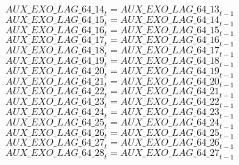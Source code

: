 \begin{dmath}
{AUX\_EXO\_LAG\_64\_14}_{t}={AUX\_EXO\_LAG\_64\_13}_{t-1}
\end{dmath}
\begin{dmath}
{AUX\_EXO\_LAG\_64\_15}_{t}={AUX\_EXO\_LAG\_64\_14}_{t-1}
\end{dmath}
\begin{dmath}
{AUX\_EXO\_LAG\_64\_16}_{t}={AUX\_EXO\_LAG\_64\_15}_{t-1}
\end{dmath}
\begin{dmath}
{AUX\_EXO\_LAG\_64\_17}_{t}={AUX\_EXO\_LAG\_64\_16}_{t-1}
\end{dmath}
\begin{dmath}
{AUX\_EXO\_LAG\_64\_18}_{t}={AUX\_EXO\_LAG\_64\_17}_{t-1}
\end{dmath}
\begin{dmath}
{AUX\_EXO\_LAG\_64\_19}_{t}={AUX\_EXO\_LAG\_64\_18}_{t-1}
\end{dmath}
\begin{dmath}
{AUX\_EXO\_LAG\_64\_20}_{t}={AUX\_EXO\_LAG\_64\_19}_{t-1}
\end{dmath}
\begin{dmath}
{AUX\_EXO\_LAG\_64\_21}_{t}={AUX\_EXO\_LAG\_64\_20}_{t-1}
\end{dmath}
\begin{dmath}
{AUX\_EXO\_LAG\_64\_22}_{t}={AUX\_EXO\_LAG\_64\_21}_{t-1}
\end{dmath}
\begin{dmath}
{AUX\_EXO\_LAG\_64\_23}_{t}={AUX\_EXO\_LAG\_64\_22}_{t-1}
\end{dmath}
\begin{dmath}
{AUX\_EXO\_LAG\_64\_24}_{t}={AUX\_EXO\_LAG\_64\_23}_{t-1}
\end{dmath}
\begin{dmath}
{AUX\_EXO\_LAG\_64\_25}_{t}={AUX\_EXO\_LAG\_64\_24}_{t-1}
\end{dmath}
\begin{dmath}
{AUX\_EXO\_LAG\_64\_26}_{t}={AUX\_EXO\_LAG\_64\_25}_{t-1}
\end{dmath}
\begin{dmath}
{AUX\_EXO\_LAG\_64\_27}_{t}={AUX\_EXO\_LAG\_64\_26}_{t-1}
\end{dmath}
\begin{dmath}
{AUX\_EXO\_LAG\_64\_28}_{t}={AUX\_EXO\_LAG\_64\_27}_{t-1}
\end{dmath}
